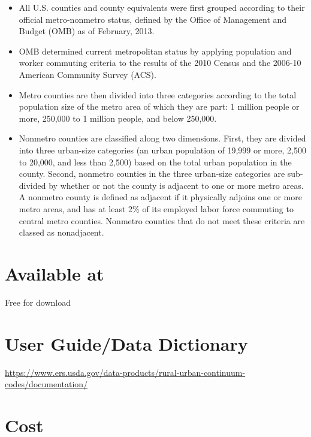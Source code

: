 \documentclass[
]{book}
\providecommand{\tightlist}{%
  \setlength{\itemsep}{0pt}\setlength{\parskip}{0pt}}
\begin{document}
\begin{itemize}
\tightlist
\item
  All U.S. counties and county equivalents were first grouped according to their official metro-nonmetro status, defined by the Office of Management and Budget (OMB) as of February, 2013.
\item
  OMB determined current metropolitan status by applying population and worker commuting criteria to the results of the 2010 Census and the 2006-10 American Community Survey (ACS).
\item
  Metro counties are then divided into three categories according to the total population size of the metro area of which they are part: 1 million people or more, 250,000 to 1 million people, and below 250,000.
\item
  Nonmetro counties are classified along two dimensions. First, they are divided into three urban-size categories (an urban population of 19,999 or more, 2,500 to 20,000, and less than 2,500) based on the total urban population in the county. Second, nonmetro counties in the three urban-size categories are sub- divided by whether or not the county is adjacent to one or more metro areas. A nonmetro county is defined as adjacent if it physically adjoins one or more metro areas, and has at least 2\% of its employed labor force commuting to central metro counties. Nonmetro counties that do not meet these criteria are classed as nonadjacent.
\end{itemize}

\hypertarget{available-at-75}{%
\section{Available at}\label{available-at-75}}

Free for download

\hypertarget{user-guidedata-dictionary-75}{%
\section{User Guide/Data Dictionary}\label{user-guidedata-dictionary-75}}

\url{https://www.ers.usda.gov/data-products/rural-urban-continuum-codes/documentation/}

\hypertarget{cost-75}{%
\section{Cost}\label{cost-75}}
\end{document}
